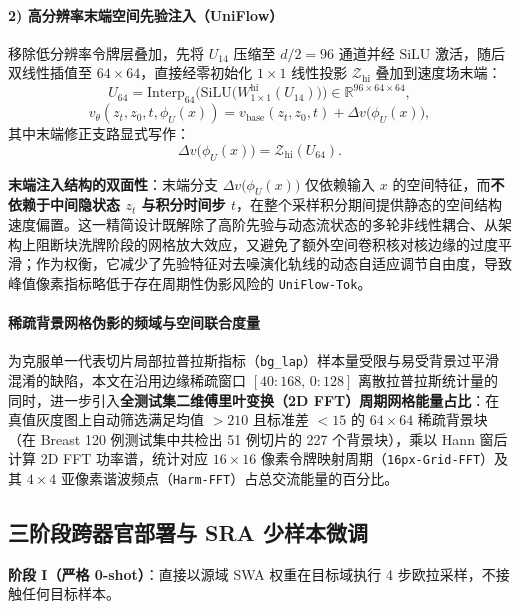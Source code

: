 \documentclass[journal]{IEEEtran}
\newcommand{\methodname}{UniFlow}
\begin{document}
\paragraph{2) 高分辨率末端空间先验注入（\methodname{}）} 移除低分辨率令牌层叠加，先将 $U_{14}$ 压缩至 $d/2=96$ 通道并经 $\text{SiLU}$ 激活，随后双线性插值至 $64\times 64$，直接经零初始化 $1\times 1$ 线性投影 $\mathcal{Z}_{\text{hi}}$ 叠加到速度场末端：
\begin{equation}
U_{64} = \text{Interp}_{64}\Big(\text{SiLU}\big(W_{1\times 1}^{\text{hi}}(U_{14})\big)\Big) \in \mathbb{R}^{96\times 64\times 64},
\end{equation}
\begin{equation}
v_\theta(z_t, z_0, t, \phi_U(x)) = v_{\text{base}}(z_t, z_0, t) + \Delta v\big(\phi_U(x)\big),
\end{equation}
其中末端修正支路显式写作：
\begin{equation}
\Delta v\big(\phi_U(x)\big) = \mathcal{Z}_{\text{hi}}(U_{64}).
\end{equation}

\noindent\textbf{末端注入结构的双面性}：末端分支 $\Delta v\big(\phi_U(x)\big)$ 仅依赖输入 $x$ 的空间特征，而\textbf{不依赖于中间隐状态 $z_t$ 与积分时间步 $t$}，在整个采样积分期间提供静态的空间结构速度偏置。这一精简设计既解除了高阶先验与动态流状态的多轮非线性耦合、从架构上阻断块洗牌阶段的网格放大效应，又避免了额外空间卷积核对核边缘的过度平滑；作为权衡，它减少了先验特征对去噪演化轨线的动态自适应调节自由度，导致峰值像素指标略低于存在周期性伪影风险的 \texttt{UniFlow-Tok}。

\paragraph{稀疏背景网格伪影的频域与空间联合度量} 为克服单一代表切片局部拉普拉斯指标（\texttt{bg\_lap}）样本量受限与易受背景过平滑混淆的缺陷，本文在沿用边缘稀疏窗口 $[40:168,\,0:128]$ 离散拉普拉斯统计量的同时，进一步引入\textbf{全测试集二维傅里叶变换（2D FFT）周期网格能量占比}：在真值灰度图上自动筛选满足均值 $>210$ 且标准差 $<15$ 的 $64\times 64$ 稀疏背景块（在 Breast 120 例测试集中共检出 51 例切片的 227 个背景块），乘以 Hann 窗后计算 2D FFT 功率谱，统计对应 $16\times 16$ 像素令牌映射周期（\texttt{16px-Grid-FFT}）及其 $4\times 4$ 亚像素谐波频点（\texttt{Harm-FFT}）占总交流能量的百分比。

\subsection{三阶段跨器官部署与 SRA 少样本微调}
\noindent\textbf{阶段 I（严格 0-shot）}：直接以源域 SWA 权重在目标域执行 4 步欧拉采样，不接触任何目标样本。
\end{document}
